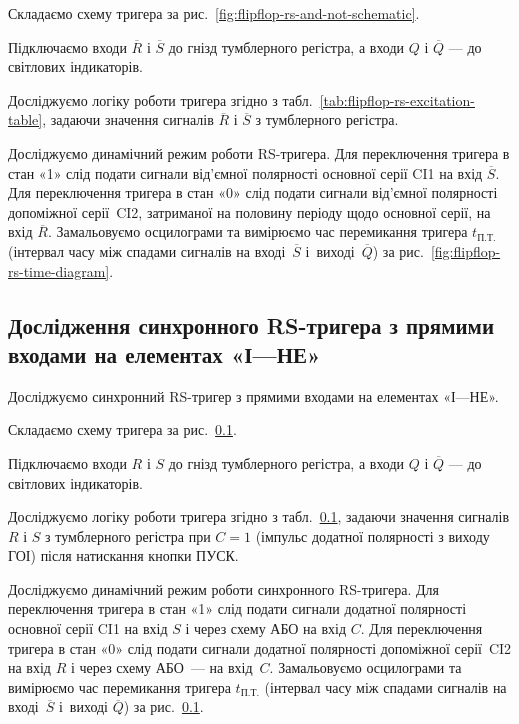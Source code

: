 \documentclass[a4paper,oneside,DIV=10,12pt]{scrartcl}
\newcommand\barneg[1]{\overline{#1}}
\begin{document}
			\begin{steps}
				\item Складаємо схему тригера за рис.~\ref{fig:flipflop-rs-and-not-schematic}.
			
				\item Підключаємо входи $\barneg{R}$ і $\barneg{S}$ до гнізд тумблерного регістра, а входи $Q$ і $\barneg{Q}$ — до світлових індикаторів.
				
				\item Досліджуємо логіку роботи тригера згідно з табл.~\ref{tab:flipflop-rs-excitation-table}, задаючи значення сигналів $\barneg{R}$ і $\barneg{S}$ з тумблерного регістра.
				
				\item Досліджуємо динамічний режим роботи RS-тригера. Для переключення тригера в стан «1» слід подати сигнали від'ємної полярності основної серії CI1 на вхід $\barneg{S}$. Для переключення тригера в стан «0» слід подати сигнали від'ємної полярності допоміжної серії~CI2, затриманої на половину періоду щодо основної серії, на вхід $\barneg{R}$. Замальовуємо осцилограми та вимірюємо час перемикання тригера $t_{\text{П.Т.}}$ (інтервал часу між спадами сигналів на вході~$\barneg{S}$ і~виході~$\barneg{Q}$) за рис.~\ref{fig:flipflop-rs-time-diagram}.
			\end{steps}
		
		\subsection{Дослідження синхронного RS-тригера з прямими входами на елементах «І—НЕ»}
			Досліджуємо синхронний RS-тригер з прямими входами на елементах «І—НЕ».
			\begin{steps}
				\item Складаємо схему тригера за рис.~\ref{}.
				
				\item Підключаємо входи $R$ і $S$ до гнізд тумблерного регістра, а входи $Q$ і $\barneg{Q}$ — до світлових індикаторів.
				
				\item Досліджуємо логіку роботи тригера згідно з табл.~\ref{}, задаючи значення сигналів $R$ і $S$ з тумблерного регістра при $C = 1$ (імпульс додатної полярності з виходу ГОІ) після натискання кнопки ПУСК.
				
				\item Досліджуємо динамічний режим роботи синхронного RS-тригера. Для переключення тригера в стан «1» слід подати сигнали додатної полярності основної серії CI1 на вхід $S$ і через схему АБО на вхід $C$. Для переключення тригера в стан «0» слід подати сигнали додатної полярності допоміжної серії~CI2 на вхід $R$ і через схему АБО~— на вхід~$C$. Замальовуємо осцилограми та вимірюємо час перемикання тригера $t_{\text{П.Т.}}$ (інтервал часу між спадами сигналів на вході~$\barneg{S}$ і~виході $\barneg{Q}$) за рис.~\ref{}.
			\end{steps}
		
\end{document}
